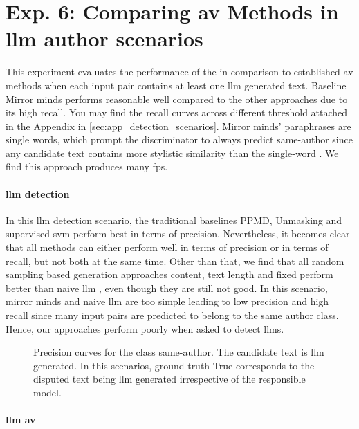 \section{Exp. 6: Comparing \ac{av} Methods in \acs{llm} author scenarios}

This experiment evaluates the performance of the \impAppr{} in comparison to established \ac{av} methods when each input pair contains at least one \ac{llm} generated text.
Baseline Mirror minds performs reasonable well compared to the other approaches due to its high recall.
You may find the recall curves across different threshold attached in the Appendix in \autoref{sec:app_detection_scenarios}.
Mirror minds' paraphrases are single words, which prompt the discriminator to always predict same-author since any candidate text contains more stylistic similarity than the single-word \imps{}.
We find this approach produces many \acp{fp}.


\paragraph{\ac{llm} detection}

In this \ac{llm} detection scenario, the traditional baselines PPMD, Unmasking and supervised \ac{svm} perform best in terms of precision.
Nevertheless, it becomes clear that all methods can either perform well in terms of precision or in terms of recall, but not both at the same time.
Other than that, we find that all random sampling based \imp{} generation approaches content, text length and fixed perform better than naive \ac{llm} \imps{}, even though they are still not good.
In this scenario, mirror minds and naive \ac{llm} \imps{} are too simple leading to low precision and high recall since many input pairs are predicted to belong to the same author class.
Hence, our approaches perform poorly when asked to detect \acp{llm}.


\begin{figure}[b]
  
\caption{Precision curves for the class same-author. 
The candidate text is \ac{llm} generated.
In this scenarios, ground truth True corresponds to the disputed text being \ac{llm} generated irrespective of the responsible model.
}
\label{fig:llm_detection_prec}
\end{figure}

\paragraph{\ac{llm} \ac{av}}

